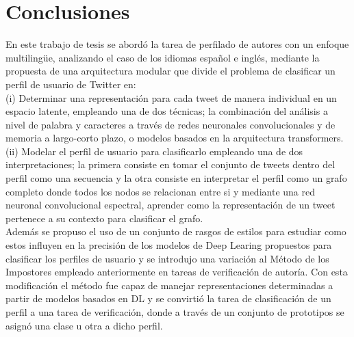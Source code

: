 \chapter*{Conclusiones}

En este trabajo de tesis se abordó la tarea de perfilado de autores con un enfoque multilingüe, analizando el caso de los idiomas español e inglés, mediante la propuesta de una arquitectura modular que divide el problema de clasificar un perfil de usuario de Twitter en:
\\ (i) Determinar una representación para cada tweet de manera individual en un espacio latente, empleando una de dos técnicas; la combinación del análisis a nivel de palabra y caracteres a través de redes neuronales convolucionales y de memoria a largo-corto plazo, o modelos basados en la arquitectura transformers. \\
(ii) Modelar el perfil de usuario para clasificarlo empleando una de dos interpretaciones; la primera consiste en tomar el conjunto de tweets dentro del perfil como una secuencia y la otra consiste en interpretar el perfil como un grafo completo donde todos los nodos se relacionan entre si y mediante una red neuronal convolucional espectral, aprender como la representación de un tweet pertenece a su contexto para clasificar el grafo.
\\
Además se propuso el uso de un conjunto de rasgos de estilos para estudiar como estos influyen en la precisión de los modelos de Deep Learing propuestos para clasificar los perfiles de usuario y se introdujo una variación al Método de los Impostores empleado anteriormente en tareas de verificación de autoría. Con esta modificación el método fue capaz de manejar representaciones determinadas a partir de modelos basados en DL y se convirtió la tarea de clasificación de un perfil a una tarea de verificación, donde a través de un conjunto de prototipos se asignó una clase u otra a dicho perfil.  
\\\\

